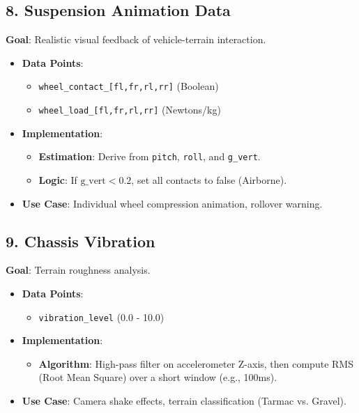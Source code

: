 \documentclass[11pt,a4paper]{article}
\begin{document}
\subsection{8. Suspension Animation Data}
\textbf{Goal}: Realistic visual feedback of vehicle-terrain interaction.
\begin{itemize}
    \item \textbf{Data Points}:
    \begin{itemize}
        \item \texttt{wheel\_contact\_[fl,fr,rl,rr]} (Boolean)
        \item \texttt{wheel\_load\_[fl,fr,rl,rr]} (Newtons/kg)
    \end{itemize}
    \item \textbf{Implementation}:
    \begin{itemize}
        \item \textbf{Estimation}: Derive from \texttt{pitch}, \texttt{roll}, and \texttt{g\_vert}.
        \item \textbf{Logic}: If $\text{g\_vert} < 0.2$, set all contacts to false (Airborne).
    \end{itemize}
    \item \textbf{Use Case}: Individual wheel compression animation, rollover warning.
\end{itemize}

\subsection{9. Chassis Vibration}
\textbf{Goal}: Terrain roughness analysis.
\begin{itemize}
    \item \textbf{Data Points}:
    \begin{itemize}
        \item \texttt{vibration\_level} (0.0 - 10.0)
    \end{itemize}
    \item \textbf{Implementation}:
    \begin{itemize}
        \item \textbf{Algorithm}: High-pass filter on accelerometer Z-axis, then compute RMS (Root Mean Square) over a short window (e.g., 100ms).
    \end{itemize}
    \item \textbf{Use Case}: Camera shake effects, terrain classification (Tarmac vs. Gravel).
\end{itemize}
\end{document}
